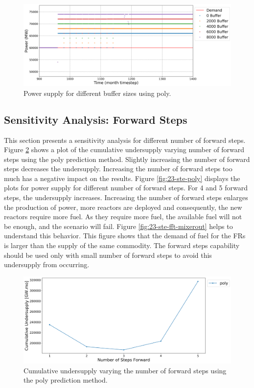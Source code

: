 \documentclass[11pt]{article}
\begin{document}
\begin{figure}[H]
	\centering
	\includegraphics[width=\textwidth]{23-figures/23-power-buffer-poly.png} 
	\hfill
	\caption{Power supply for different buffer sizes using poly.}
	\label{fig:23-buf-poly}
\end{figure}

\subsection{Sensitivity Analysis: Forward Steps}

This section presents a sensitivity analysis for different number of forward steps.
Figure \ref{fig:23-steps} shows a plot of the cumulative undersupply 
varying number of forward steps using the poly prediction method.
Slightly increasing the number of forward steps decreases the undersupply. 
Increasing the number of forward steps too much has a negative impact on the results.
Figure \ref{fig:23-ste-poly} displays the plots for power supply for different 
number of forward steps. For 4 and 5 forward steps, the undersupply increases.
Increasing the number of forward steps enlarges the production of power, 
more reactors are deployed and consequently, the new reactors require more fuel. 
As they require more fuel, the available fuel will not be enough,
and the scenario will fail. 
Figure \ref{fig:23-ste-fft-mixerout} helps to understand this behavior. 
This figure shows that the demand of fuel for the FRs is larger than the 
supply of the same commodity.
The forward steps capability should be used only with small number of forward steps 
to avoid this undersupply from occurring. 

\begin{figure}[H]
	\centering
	\includegraphics[width=\textwidth]{23-figures/23-sens-steps.png} 
	\hfill
	\caption{Cumulative undersupply varying the number of forward steps using the poly prediction method.}
	\label{fig:23-steps}
\end{figure}
\end{document}
